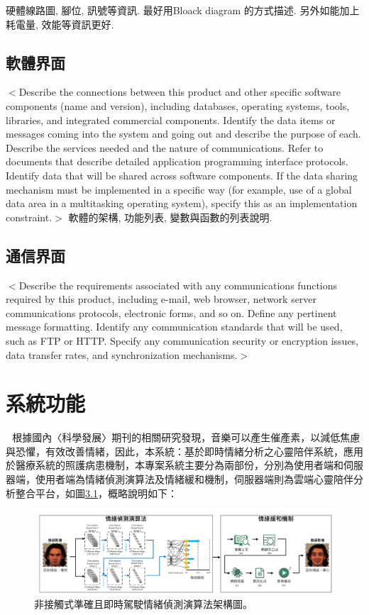 \documentclass[12pt]{scrreprt}
\begin{document}
硬體線路圖, 腳位, 訊號等資訊. 最好用Bloack diagram 的方式描述.
另外如能加上耗電量, 效能等資訊更好.

\section{軟體界面}
$<$Describe the connections between this product and other specific software 
components (name and version), including databases, operating systems, tools, 
libraries, and integrated commercial components. Identify the data items or 
messages coming into the system and going out and describe the purpose of each.  
Describe the services needed and the nature of communications. Refer to 
documents that describe detailed application programming interface protocols.  
Identify data that will be shared across software components. If the data 
sharing mechanism must be implemented in a specific way (for example, use of a 
global data area in a multitasking operating system), specify this as an 
implementation constraint.$>$
軟體的架構, 功能列表, 變數與函數的列表說明.

\section{通信界面}
$<$Describe the requirements associated with any communications functions 
required by this product, including e-mail, web browser, network server 
communications protocols, electronic forms, and so on. Define any pertinent 
message formatting. Identify any communication standards that will be used, such 
as FTP or HTTP. Specify any communication security or encryption issues, data 
transfer rates, and synchronization mechanisms.$>$


\chapter{系統功能}

$~~~$根據國內〈科學發展〉期刊的相關研究發現，音樂可以產生催產素，以減低焦慮與恐懼，有效改善情緒，因此，本系統：基於即時情緒分析之心靈陪伴系統，應用於醫療系統的照護病患機制，本專案系統主要分為兩部份，分別為使用者端和伺服器端，使用者端為情緒偵測演算法及情緒緩和機制，伺服器端則為雲端心靈陪伴分析整合平台，如圖\ref{fig:framework}，概略說明如下：

\begin{figure}[!h]
\begin{center}
\includegraphics[width=1\textwidth]{./figs/framework.pdf}
\end{center}
\caption{非接觸式準確且即時駕駛情緒偵測演算法架構圖。}
\label{fig:framework}
\end{figure}
\end{document}

